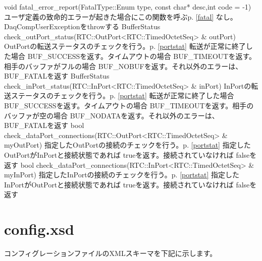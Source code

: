 \documentclass[a4j,10pt,dvips,onecolumn,oneside,final]{jarticle}%
\begin{document}
       {void fatal\_error\_report(FatalType::Enum type, const char* desc,int code = -1) }
       {ユーザ定義の致命的エラーが起きた場合にこの関数を呼ぶp.\pageref{fatal} \ref{fatal}}
       {なし。DaqCompUserExceptionをthrowする}
       {}
       {BufferStatus check\_outPort\_status(RTC::OutPort<RTC::TimedOctetSeq> \& outPort) }
       {OutPortの転送ステータスのチェックを行う。p.\pageref{portstat} \ref{portstat}}
       {転送が正常に終了した場合 BUF\_SUCCESSを返す。タイムアウトの場合 BUF\_TIMEOUTを返す。相手のバッファがフルの場合
       BUF\_NOBUFを返す。それ以外のエラーは、BUF\_FATALを返す}
       {}
       {BufferStatus check\_inPort\_status(RTC::InPort<RTC::TimedOctetSeq> \& inPort) }
       {InPortの転送ステータスのチェックを行う。p.\pageref{portstat} \ref{portstat}}
       {転送が正常に終了した場合 BUF\_SUCCESSを返す。タイムアウトの場合 BUF\_TIMEOUTを返す。相手のバッファが空の場合
       BUF\_NODATAを返す。それ以外のエラーは、BUF\_FATALを返す}
       {}
       {bool check\_dataPort\_connections(RTC::OutPort<RTC::TimedOctetSeq> \& myOutPort)}
       {指定したOutPortの接続のチェックを行う。p.\pageref{portstat} \ref{portstat}}
       {指定したOutPortがInPortと接続状態であれば trueを返す。接続されていなければ falseを返す}
       {}
       {bool check\_dataPort\_connections(RTC::InPort<RTC::TimedOctetSeq> \& myInPort)}
       {指定したInPortの接続のチェックを行う。p.\pageref{portstat} \ref{portstat}}
       {指定したInPortがOutPortと接続状態であれば trueを返す。接続されていなければ falseを返す}
       {}
\newpage
\section{config.xsd}\label{config.xsd}
コンフィグレーションファイルのXMLスキーマを下記に示します。
\end{document}
